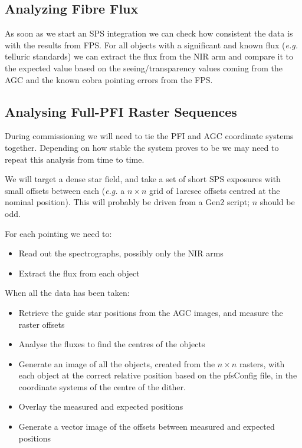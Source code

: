 \documentclass[12pt]{article}
\newcommand{\eg}{\textit{e.g.}\xspace}
\newcommand{\AGC}{\gls{AGC}\xspace}
\newcommand{\FPS}{\gls{FPS}\xspace}
\newcommand{\PFI}{\gls{PFI}\xspace}
\newcommand{\SPS}{\gls{SPS}\xspace}
\begin{document}
\subsection{Analyzing Fibre Flux}

As soon as we start an \SPS integration we can check how consistent the data is with the
results from \FPS.  For all objects with a significant and known flux (\eg telluric standards) we
can extract the flux from the \gls{NIR} arm and compare it to the expected value based on the
seeing/transparency values coming from the \AGC and the known cobra pointing errors from the \FPS.

\subsection{Analysing Full-PFI Raster Sequences}

During commissioning we will need to tie the \PFI and \AGC coordinate systems together.   Depending
on how stable the system proves to be we may need to repeat this analysis from time to time.

We will target a dense star field, and take a set of short \SPS exposures with small offsets
between each (\eg a $n\times n$ grid of 1arcsec offsets centred at the nominal position).  This
will probably be driven from a \gls{Gen2} script; $n$ should be odd.

For each pointing we need to:
\begin{itemize}
\item Read out the spectrographs, possibly only the \gls{NIR} arms
\item Extract the flux from each object
\end{itemize}

When all the data has been taken:
\begin{itemize}
\item Retrieve the guide star positions from the \AGC images, and measure the raster offsets
\item Analyse the fluxes to find the centres of the objects
\item Generate an image of all the objects, created from the $n\times n$ rasters, with each object
  at the correct relative position based on the \gls{pfsConfig} file, in the coordinate systems
  of the centre of the dither.
\item Overlay the measured and expected positions
\item Generate a vector image of the offsets between measured and expected positions
\end{itemize}
\end{document}
